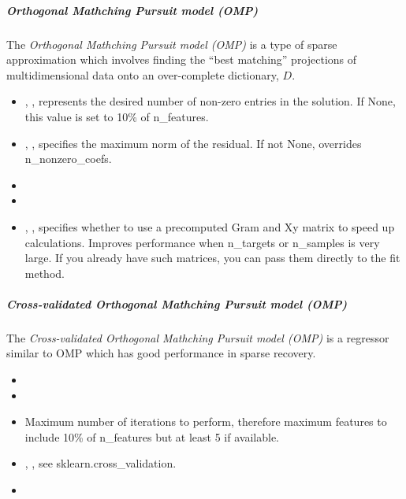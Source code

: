 \subparagraph{Orthogonal Mathching Pursuit model (OMP)}
\mbox{}

The \textit{Orthogonal Mathching Pursuit model (OMP)} is a type of sparse
approximation which involves finding the ``best matching'' projections of
multidimensional data onto an over-complete dictionary, $D$.
%
\begin{itemize}
  \item {}, , represents
  the desired number of non-zero entries in the solution.
  If None, this value is set to 10\% of n\_features.
  \item {}, , specifies the maximum
  norm of the residual.
  If not None, overrides n\_nonzero\_coefs.
  \item {}
  \item {}
  \item {}, , specifies
  whether to use a precomputed Gram and Xy matrix to speed up calculations.
  Improves performance when n\_targets or n\_samples is very large.
  \nb If you already have such matrices, you can pass them directly to the
  fit method.
\end{itemize}

\subparagraph{Cross-validated Orthogonal Mathching Pursuit model (OMP)}
\mbox{}

The \textit{Cross-validated Orthogonal Mathching Pursuit model (OMP)} is a
regressor similar to OMP which has good performance in sparse recovery.
%
\begin{itemize}
  \item {}
  \item {}
  \item \maxIterDescription{}
  Maximum number of iterations to perform, therefore maximum features to
  include 10\% of n\_features but at least 5 if available.
  \item {}, ,
  see sklearn.cross\_validation.
  \item \verDescriptionB
\end{itemize}

